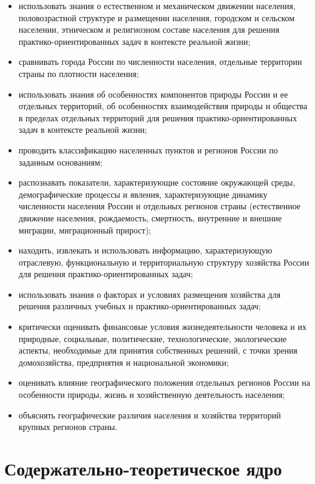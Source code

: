 \documentclass[
  11pt,
]{book}
\begin{document}
\begin{itemize}
\item
  использовать знания о естественном и механическом движении населения, половозрастной структуре и размещении населения, городском и сельском населении, этническом и религиозном составе населения для решения практико-ориентированных задач в контексте реальной жизни;
\item
  сравнивать города России по численности населения, отдельные территории страны по плотности населения;
\item
  использовать знания об особенностях компонентов природы России и ее отдельных территорий, об особенностях взаимодействия природы и общества в пределах отдельных территорий для решения практико-ориентированных задач в контексте реальной жизни;
\item
  проводить классификацию населенных пунктов и регионов России по заданным основаниям;
\item
  распознавать показатели, характеризующие состояние окружающей среды, демографические процессы и явления, характеризующие динамику численности населения России и отдельных регионов страны (естественное движение населения, рождаемость, смертность, внутренние и внешние миграции, миграционный прирост);
\item
  находить, извлекать и использовать информацию, характеризующую отраслевую, функциональную и территориальную структуру хозяйства России для решения практико-ориентированных задач;
\item
  использовать знания о факторах и условиях размещения хозяйства для решения различных учебных и практико-ориентированных задач;
\item
  критически оценивать финансовые условия жизнедеятельности человека и их природные, социальные, политические, технологические, экологические аспекты, необходимые для принятия собственных решений, с точки зрения домохозяйства, предприятия и национальной экономики;
\item
  оценивать влияние географического положения отдельных регионов России на особенности природы, жизнь и хозяйственную деятельность населения;
\item
  объяснять географические различия населения и хозяйства территорий крупных регионов страны.
\end{itemize}

\section*{Содержательно-теоретическое ядро}\label{ux441ux43eux434ux435ux440ux436ux430ux442ux435ux43bux44cux43dux43e-ux442ux435ux43eux440ux435ux442ux438ux447ux435ux441ux43aux43eux435-ux44fux434ux440ux43e}
\end{document}
